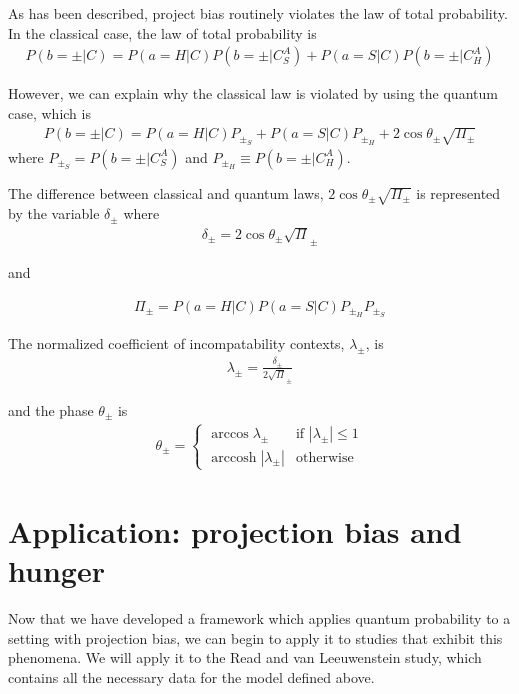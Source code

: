 \documentclass[12pt]{article}
\DeclareMathOperator{\arccosh}{arccosh}
\begin{document}
	 As has been described, project bias routinely violates the law of total probability. In the classical case, the law of total probability is 
	 \begin{align}
	 P(b=\pm |C)=P(a=H|C)P(b=\pm|C_S^A) + P(a=S|C)P(b=\pm|C_H^A)
	 \end{align}
	 
	 However, we can explain why the classical law is violated by using the quantum case, which is
	\begin{align}
		P(b=\pm|C)=P(a=H|C)P_{\pm_S} + P(a=S|C)P_{\pm_H} + 2\cos \theta_{\pm} \sqrt{\Pi_{\pm}}
	\end{align}
	where $P_{\pm_S} = P(b=\pm|C_S^A) $ and $P_{\pm_H} \equiv P(b=\pm|C_H^A)$.
	
	The difference between classical and quantum laws, $ 2\cos \theta_{\pm} \sqrt{\Pi_{\pm}}$ is represented by the variable $\delta_\pm$ where
	\begin{align}
	\delta_\pm = 2\cos\theta_\pm\sqrt\Pi_\pm 
	\end{align}
	
	and
	
	\begin{align}
	\Pi_{\pm} = P(a=H|C)P(a=S|C)P_{\pm_H}P_{\pm_S}
	\end{align}
	
	The normalized coefficient of incompatability contexts, $\lambda_\pm$, is
	\begin{align}
	\lambda_\pm = \frac{\delta_\pm}{2\sqrt\Pi_\pm}
	\end{align}	 
	
	and the phase $\theta_\pm$ is
	\begin{align}
	\theta_{\pm} =
	\begin{cases}
	\arccos \lambda_\pm & \text{if } |\lambda_\pm| \leq 1 \\
	\arccosh |\lambda_\pm| & \text{otherwise}
	\end{cases}
	\end{align}
	
\section{Application: projection bias and hunger}
	Now that we have developed a framework which applies quantum probability to a setting with projection bias, we can begin to apply it to studies that exhibit this phenomena. We will apply it to the Read and van Leeuwenstein study, which contains all the necessary data for the model defined above. 
	
\end{document}
